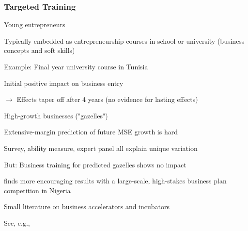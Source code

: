\documentclass[hideothersubsections, usenames,dvipsnames,11pt]{beamer}
\newenvironment{itemize_2pt}{\itemize\addtolength{\itemsep}{2pt}}{\enditemize}
\begin{document}
\begin{frame}
\frametitle{Targeted Training}
	Young entrepreneurs
	\begin{itemize_2pt}
		\item Typically embedded as \textcolor{bdf}{entrepreneurship courses in school or university} (business concepts and soft skills)
		\item Example: Final year university course in Tunisia \citep{Alaref2020}
		\begin{itemize_2pt}
			\item Initial positive impact on business entry
			\item[] $\rightarrow$ \textcolor{bdf}{Effects taper off after 4 years} (no evidence for lasting effects)
		\end{itemize_2pt}
	\end{itemize_2pt}
	
\pause

\vspace{0.5em}

High-growth businesses ("gazelles")
\begin{itemize_2pt}
	\item Extensive-margin prediction of future MSE growth is hard \citep{Fafchamps2017}
	\begin{itemize_2pt}
		\item Survey, ability measure, expert panel all explain unique variation
		\item But: \textcolor{bdf}{Business training for predicted gazelles shows no impact}
	\end{itemize_2pt} 
	
	\item \citet{McKenzie2017a} finds \textcolor{bdf}{more encouraging results with a large-scale, high-stakes business plan competition} in Nigeria
	
	\item Small literature on business accelerators and incubators
	\begin{itemize_2pt}
		\item See, e.g., \citet{Cusolito2021, GonzalezUribe2018, GonzalezUribe2021}
	\end{itemize_2pt}
\end{itemize_2pt}
	
\end{frame}

\end{document}
